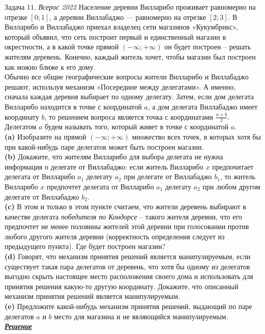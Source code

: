 \begin{mybox}{Задача 11. \textit{Всерос 2022}}
    \indent\setlength{\parindent}{1em}\indent\setlength{\parindent}{1em}Население деревни Вилларибо проживает равномерно
    на отрезке $[0; 1]$, а деревни Виллабаджо –– равномерно на отрезке $[2; 3]$. В Вилларибо и Виллабаджо приехал
    владелец сети магазинов «Кукумбрикс», который объявил, что сеть построит первый и единственный магазин в
    окрестности, а в какой точке прямой $(-\infty; +\infty)$ он будет построен –
    решать жителям деревень. Конечно, каждый житель хочет, чтобы магазин был построен как можно ближе к его дому.\\
    \indent\setlength{\parindent}{1em}Обычно все общие географические вопросы жители Вилларибо и Виллабаджо решают,
    используя механизм «Посередине между делегатами». А именно, сначала каждая деревня выбирает по одному делегату.
    Затем, если дом делегата Вилларибо находится в точке с координатой $a$, а дом делегата Виллабаджо имеет
    координату $b$, то решением вопроса является точка с координатами $\frac{a+b}{2}$. Делегатом $a$ будем называть
    того, который живет в точке с координатой $a$.\smallskip\\
    \indent\setlength{\parindent}{1em}\textbf{(a)} Изобразите на прямой $(-\infty; +\infty)$ множество всех точек, в
    которых хотя бы при какой-нибудь паре делегатов может быть построен магазин.\smallskip\\
    \indent\setlength{\parindent}{1em}\textbf{(b)} Докажите, что жителям Вилларибо для выбора делегата не нужна
    информация о делегате от Виллабаджо: если житель Вилларибо $x$ предпочитает делегата от Вилларибо $a_1$ делегату
    $a_2$ при делегате от Виллабаджо $b_1$, то житель Вилларибо $x$ предпочтет делегата от Вилларибо $a_1$ делегату $
    a_2$ при любом другом делегате от Виллабаджо $b_2$.\smallskip\\
    \indent\setlength{\parindent}{1em}\textbf{(c)} В этом и только в этом пункте считаем, что жители деревень выбирают
    в качестве делегата \textit{победителя по Кондорсе} – такого жителя деревни, что его предпочтет не менее половины
    жителей этой деревни при голосовании против любого другого жителя деревни (корректность определения следует из
    предыдущего пункта). Где будет построен магазин?\smallskip\\
    \indent\setlength{\parindent}{1em}\textbf{(d)} Говорят, что механизм принятия решений является манипулируемым,
    если существует такая пара делегатов от деревень, что хотя бы одному из делегатов выгодно скрыть настоящее место
    расположения своего дома и использовать для принятия решения какую-то другую координату. Докажите, что описанный
    механизм принятия решений является манипулируемым.\smallskip\\
    \indent\setlength{\parindent}{1em}\textbf{(e)} Предложите какой-нибудь механизм принятия решений, выдающий по паре
    делегатов $a$ и $b$ место для магазина и не являющийся манипулируемым.\bigskip\\
    \textit{\textbf{\centering\href{https://iloveeconomics.ru/sites/default/files/olimp/vseros/2022/vseros_2022_solutions_10_23379.pdf}{Решение}}}
\end{mybox}


